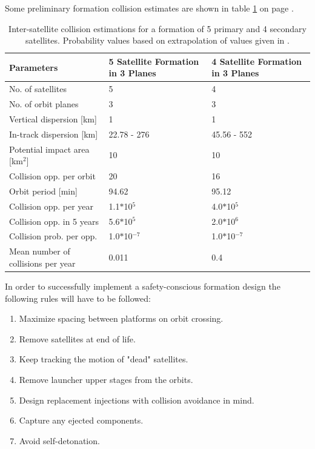 Some preliminary formation collision estimates are shown in table \ref{table:coll} on page \pageref{table:coll}.

\begin{table}
	\centering
	
		\begin{tabular}{p{5cm}|p{5cm}|p{5cm}}
		\toprule
	\textbf{Parameters} & \textbf{5 Satellite Formation in 3 Planes} & \textbf{4 Satellite Formation in 3 Planes} \\
		\hline \hline
		No. of satellites & 5 & 4 \\
		No. of orbit planes & 3 & 3 \\ 
		Vertical dispersion [km] & 1 & 1 \\
		In-track dispersion [km] & 22.78 - 276 & 45.56 - 552 \\
		Potential impact area [km$^2$] & 10 & 10 \\ 
		Collision opp. per orbit & 20 & 16 \\
		Orbit period [min] & 94.62 & 95.12 \\ 
		Collision opp. per year & 1.1$*$10$^5$ & 4.0$*$10$^5$ \\
		Collision opp. in 5 years & 5.6$*$10$^5$ & 2.0$*$10$^6$ \\
		Collision prob. per opp. & 1.0$*$10$^{-7}$ & 1.0$*$10$^{-7}$ \\
		Mean number of collisions per year & 0.011 & 0.4\\
		\bottomrule
			\end{tabular}
	\caption{Inter-satellite collision estimations for a formation of 5 primary and 4 secondary satellites. Probability values based on extrapolation of values given in \cite{constDesign}.}
	\label{table:coll}
\end{table}

In order to successfully implement a safety-conscious formation design the following rules will have to be followed:
 
\begin{enumerate}
	\item Maximize spacing between platforms on orbit crossing.
	\item Remove satellites at end of life.
	\item Keep tracking the motion of "dead" satellites.
	\item Remove launcher upper stages from the orbits.
	\item Design replacement injections with collision avoidance in mind.
	\item Capture any ejected components.
	\item Avoid self-detonation.
\end{enumerate}
 
